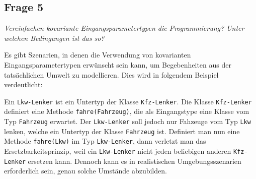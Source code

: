 \documentclass[a4paper,10pt]{article}
\begin{document}

\subsection{Frage 5}

\emph{Vereinfachen kovariante Eingangsparametertypen die Programmierung? Unter 
welchen Bedingungen ist das so?}

\vspace{3mm}

Es gibt Szenarien, in denen die Verwendung von kovarianten Eingangsparametertypen erwünscht sein kann, um Begebenheiten aus der tatsächlichen Umwelt zu modellieren. Dies wird in folgendem Beispiel verdeutlicht:

Ein \lstinline|Lkw-Lenker| ist ein Untertyp der Klasse \lstinline|Kfz-Lenker|. Die Klasse \lstinline|Kfz-Lenker| definiert eine Methode \lstinline|fahre(Fahrzeug)|, die als Eingangstype eine Klasse vom Typ \lstinline|Fahrzeug| erwartet. Der \lstinline|Lkw-Lenker| soll jedoch nur Fahzeuge vom Typ \lstinline|Lkw| lenken, welche ein Untertyp der Klasse \lstinline|Fahrzeug| ist. Definiert man nun eine Methode \lstinline|fahre(Lkw)| im Typ \lstinline|Lkw-Lenker|, dann verletzt man das Ersetzbarkeitsprinzip, weil ein \lstinline|Lkw-Lenker| nicht jeden beliebigen anderen \lstinline|Kfz-Lenker| ersetzen kann. Dennoch kann es in realistischen Umgebungsszenarien erforderlich sein, genau solche Umstände abzubilden.





\begin{comment}
Von OOP: Mehrfach dynamisches Binden, Multimethoden.
\end{comment}
\end{document}
